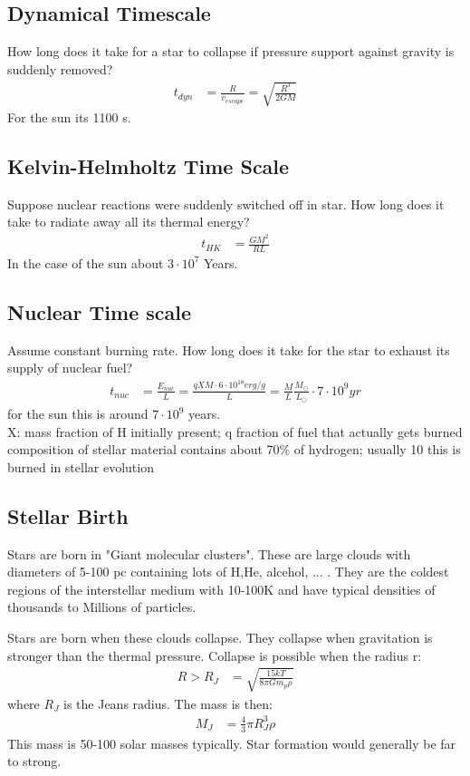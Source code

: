 \documentclass[11pt,a4paper]{article}
\begin{document}
\subsection{Dynamical Timescale}
How long does it take for a star to collapse if pressure support against gravity is suddenly removed?
\begin{align*}
    t_{dyn} &= \frac {R} {v_{escape}} = \sqrt{\frac {R^3}{2GM}}
\end{align*}
For the sun its 1100 s.
\subsection{Kelvin-Helmholtz Time Scale}
Suppose nuclear reactions were suddenly switched off in star. How long does it
take to radiate away all its thermal energy?
\begin{align*}
t_{HK} &= \frac {GM^2}{RL} 
\end{align*}
In the case of the sun about $3 \cdot 10 ^7$ Years.
\subsection{Nuclear Time scale}
Assume constant burning rate. How long does it take for the star to exhaust its
supply of nuclear fuel?
\begin{align*}
    t_{nuc} &= \frac {E_{nuc} }{L} = \frac {qXM \cdot 6 \cdot 10^{18} erg/g}{L} = \frac M L \frac {M_\odot}{L_\odot} \cdot 7 \cdot 10^9 yr
\end{align*}
for the sun this is around $ 7 \cdot 10 ^9 $ years. \\
X: mass fraction of H initially present; q fraction of fuel that actually gets burned
composition of stellar material contains about 70\% of hydrogen; usually 10%
this is burned in stellar evolution
\subsection{Stellar Birth}
Stars are born in "Giant molecular clusters".
These are large clouds with diameters of 5-100 pc containing lots of H,He, alcehol, ... . 
They are the coldest regions of the interstellar medium with 10-100K and have typical densities of thousands to Millions of particles.

Stars are born when these clouds collapse.
They collapse when gravitation is stronger than the thermal pressure. 
Collapse is possible when the radius r: 
\begin{align*}
    R > R_J &= \sqrt{\frac{15kT}{8 \pi Gm_p \rho}} 
\end{align*}
where $R_J$ is the Jeans radius.
The mass is then: 
\begin{align*}
    M_J &= \frac {4}{3} \pi R^3_J \rho 
\end{align*}
This mass is 50-100 solar masses typically. 
Star formation would generally be far to strong.
\end{document}

